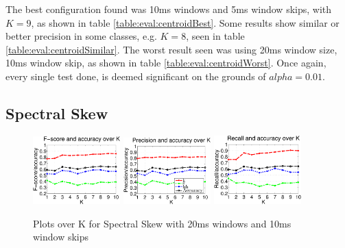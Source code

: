 		The best configuration found was 10ms windows and 5ms window skips, with $K=9$, as shown in table \ref{table:eval:centroidBest}. Some results show similar or better precision in some classes, e.g. $K=8$, seen in table \ref{table:eval:centroidSimilar}. The worst result seen was using 20ms window size, 10ms window skip, as shown in table \ref{table:eval:centroidWorst}.
		Once again, every single test done, is deemed significant on the grounds of $alpha=0.01$.
		
				
	\subsection{Spectral Skew}
			
		\begin{figure}
			\centering\includegraphics[width=0.3\textwidth]{tex/appendices/test/sskew2010FP.png}
			\centering\includegraphics[width=0.3\textwidth]{tex/appendices/test/sskew2010_P.png}
			\centering\includegraphics[width=0.3\textwidth]{tex/appendices/test/sskew2010_R.png}
			
			\caption{Plots over K for Spectral Skew with 20ms windows and 10ms window skips}
		\end{figure}
		
